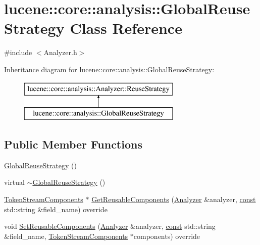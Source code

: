 \hypertarget{classlucene_1_1core_1_1analysis_1_1GlobalReuseStrategy}{}\section{lucene\+:\+:core\+:\+:analysis\+:\+:Global\+Reuse\+Strategy Class Reference}
\label{classlucene_1_1core_1_1analysis_1_1GlobalReuseStrategy}


{\ttfamily \#include $<$Analyzer.\+h$>$}

Inheritance diagram for lucene\+:\+:core\+:\+:analysis\+:\+:Global\+Reuse\+Strategy\+:\begin{figure}[H]
\begin{center}
\leavevmode
\includegraphics[height=2.000000cm]{classlucene_1_1core_1_1analysis_1_1GlobalReuseStrategy}
\end{center}
\end{figure}
\subsection*{Public Member Functions}
\begin{DoxyCompactItemize}
\item 
\mbox{\hyperlink{classlucene_1_1core_1_1analysis_1_1GlobalReuseStrategy_ac91815e66d775fd48aad17fb5a78d266}{Global\+Reuse\+Strategy}} ()
\item 
virtual \mbox{\hyperlink{classlucene_1_1core_1_1analysis_1_1GlobalReuseStrategy_a536f4c3459f19db2a356e6cedb575c1a}{$\sim$\+Global\+Reuse\+Strategy}} ()
\item 
\mbox{\hyperlink{classlucene_1_1core_1_1analysis_1_1TokenStreamComponents}{Token\+Stream\+Components}} $\ast$ \mbox{\hyperlink{classlucene_1_1core_1_1analysis_1_1GlobalReuseStrategy_a79b31d1f8bf9bec685377f6dbff3c5ba}{Get\+Reusable\+Components}} (\mbox{\hyperlink{classlucene_1_1core_1_1analysis_1_1Analyzer}{Analyzer}} \&analyzer, \mbox{\hyperlink{ZlibCrc32_8h_a2c212835823e3c54a8ab6d95c652660e}{const}} std\+::string \&field\+\_\+name) override
\item 
void \mbox{\hyperlink{classlucene_1_1core_1_1analysis_1_1GlobalReuseStrategy_a168d01df604559cb787781ad0ab7d7c2}{Set\+Reusable\+Components}} (\mbox{\hyperlink{classlucene_1_1core_1_1analysis_1_1Analyzer}{Analyzer}} \&analyzer, \mbox{\hyperlink{ZlibCrc32_8h_a2c212835823e3c54a8ab6d95c652660e}{const}} std\+::string \&field\+\_\+name, \mbox{\hyperlink{classlucene_1_1core_1_1analysis_1_1TokenStreamComponents}{Token\+Stream\+Components}} $\ast$components) override
\end{DoxyCompactItemize}
